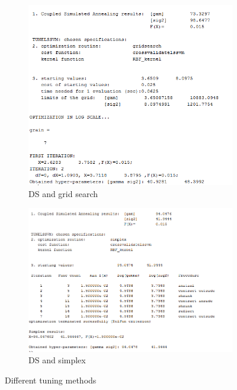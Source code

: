 \documentclass[11pt,oneside,a4paper]{article}
\begin{document}
\begin{figure}[H]
\begin{subfigure}[b]{0.4\textwidth}
		\includegraphics[width=\textwidth]{../Figures/diabetes_DS_grid}
		\caption{DS and grid search}
	\end{subfigure}
	\begin{subfigure}[b]{0.4\textwidth}
		\includegraphics[width=\textwidth]{../Figures/diabetes_DS_simp}
		\caption{DS and simplex}
	\end{subfigure}
	\caption{Different tuning methods}
	
\end{figure}
\end{document}
